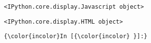 \documentclass[11pt]{article}
\begin{document}
    
    \begin{verbatim}
<IPython.core.display.Javascript object>
    \end{verbatim}

    
    
    \begin{verbatim}
<IPython.core.display.HTML object>
    \end{verbatim}

    
    \begin{Verbatim}[commandchars=\\\{\}]
{\color{incolor}In [{\color{incolor} }]:} 
\end{Verbatim}



    
    
    
    
\end{document}
